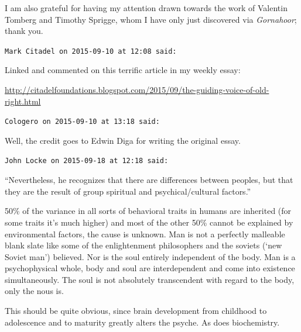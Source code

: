 \begin{footnotesize}
\begin{sffamily}
I am also grateful for having my attention drawn towards the work of Valentin Tomberg and Timothy Sprigge, whom I have only just discovered via \emph{Gornahoor}; thank you.

\hfill

\texttt{Mark Citadel on 2015-09-10 at 12:08 said:}

Linked and commented on this terrific article in my weekly essay:

\url{http://citadelfoundations.blogspot.com/2015/09/the-guiding-voice-of-old-right.html}


\hfill

\texttt{Cologero on 2015-09-10 at 13:18 said:}

Well, the credit goes to Edwin Diga for writing the original essay.

\hfill

\texttt{John Locke on 2015-09-18 at 12:18 said:}

``Nevertheless, he recognizes that there are differences between peoples, but that they are the result of group spiritual and psychical/cultural factors.''

50\% of the variance in all sorts of behavioral traits in humans are inherited (for some traits it's much higher) and most of the other 50\% cannot be explained by environmental factors, the cause is unknown. Man is not a perfectly malleable blank slate like some of the enlightenment philosophers and the soviets (`new Soviet man') believed. Nor is the soul entirely independent of the body. Man is a psychophysical whole, body and soul are interdependent and come into existence simultaneously. The soul is not absolutely transcendent with regard to the body, only the nous is.

This should be quite obvious, since brain development from childhood to adolescence and to maturity greatly alters the psyche. As does biochemistry.


\hfill

\end{sffamily}
\end{footnotesize}

